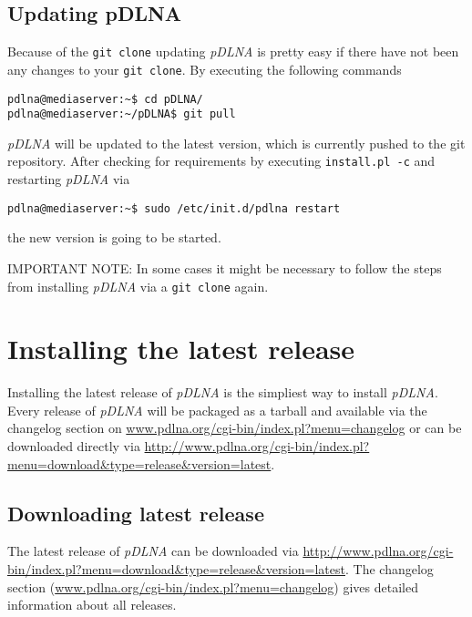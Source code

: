 \subsection{Updating pDLNA}
\label{install-unix-git-update}

Because of the \verb|git clone| updating {\em pDLNA} is pretty easy if there have not been any changes to your \verb|git clone|. By executing the following commands
\begin{lstlisting}
pdlna@mediaserver:~$ cd pDLNA/
pdlna@mediaserver:~/pDLNA$ git pull
\end{lstlisting}
{\em pDLNA} will be updated to the latest version, which is currently pushed to the git repository. After checking for requirements by executing \verb|install.pl -c| and restarting {\em pDLNA} via
\begin{lstlisting}
pdlna@mediaserver:~$ sudo /etc/init.d/pdlna restart
\end{lstlisting}
the new version is going to be started.

\begin{colframeimportantnote}
\textsc{IMPORTANT NOTE:} In some cases it might be necessary to follow the steps from installing {\em pDLNA} via a \verb|git clone| again.
\end{colframeimportantnote}

\section{Installing the latest release}
\label{install-unix-latestrelease}

Installing the latest release of {\em pDLNA} is the simpliest way to install {\em pDLNA}. Every release of {\em pDLNA} will be packaged as a tarball and available via the changelog section on \url{www.pdlna.org/cgi-bin/index.pl?menu=changelog} or can be downloaded directly via \url{http://www.pdlna.org/cgi-bin/index.pl?menu=download&type=release&version=latest}.

\subsection{Downloading latest release}
\label{install-unix-latest-release-download}

The latest release of {\em pDLNA} can be downloaded via \url{http://www.pdlna.org/cgi-bin/index.pl?menu=download&type=release&version=latest}. The changelog section (\url{www.pdlna.org/cgi-bin/index.pl?menu=changelog}) gives detailed information about all releases.

